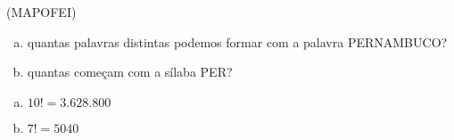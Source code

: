 \begin{ex}
 (MAPOFEI) 
    \begin{enumerate}[(a)]
    \item quantas palavras distintas podemos formar com a palavra PERNAMBUCO?
    \item quantas começam com a sílaba PER?
    \end{enumerate}
      \begin{sol}
        \phantom{A}
          \begin{enumerate}  [(a)]
              \item $10!=3.628.800$
              \item $7!=5040$
          \end{enumerate}
      \end{sol}
\end{ex}
